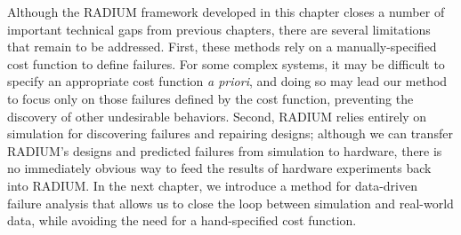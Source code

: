 Although the RADIUM framework developed in this chapter closes a number of important technical gaps from previous chapters, there are several limitations that remain to be addressed. First, these methods rely on a manually-specified cost function to define failures. For some complex systems, it may be difficult to specify an appropriate cost function \textit{a priori}, and doing so may lead our method to focus only on those failures defined by the cost function, preventing the discovery of other undesirable behaviors. Second, RADIUM relies entirely on simulation for discovering failures and repairing designs; although we can transfer RADIUM's designs and predicted failures from simulation to hardware, there is no immediately obvious way to feed the results of hardware experiments back into RADIUM. In the next chapter, we introduce a method for data-driven failure analysis that allows us to close the loop between simulation and real-world data, while avoiding the need for a hand-specified cost function.
